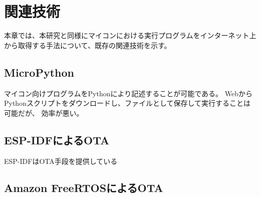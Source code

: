 \chapter{関連技術}
\label{chap:related_works}

本章では、本研究と同様にマイコンにおける実行プログラムをインターネット上から取得する手法について、既存の関連技術を示す。

\section{MicroPython}

マイコン向けプログラムをPythonにより記述することが可能である\cite{micropython}。
WebからPythonスクリプトをダウンロードし、ファイルとして保存して実行することは可能だが、
効率が悪い。

\section{ESP-IDFによるOTA}

ESP-IDFはOTA手段を提供している\cite{esp_ota}

\section{Amazon FreeRTOSによるOTA}
